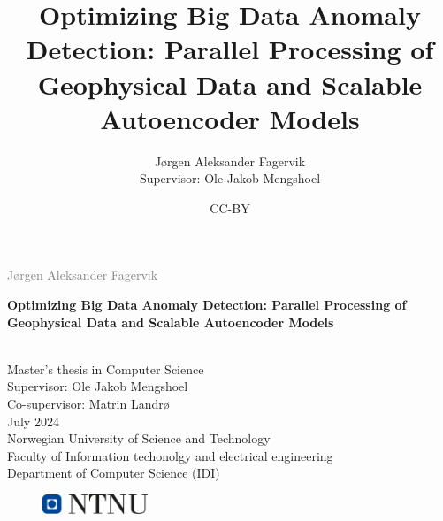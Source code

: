 \documentclass[british]{ntnuthesis}
\title{Optimizing Big Data Anomaly Detection: Parallel Processing of Geophysical Data and Scalable Autoencoder Models}
\author{Jørgen Aleksander Fagervik \\
        Supervisor: Ole Jakob Mengshoel}
\date{CC-BY \ntnuthesisdate}
\begin{document}
\begin{titlepage}
\vspace*{1.5cm}

\noindent  \textcolor{gray}{\large Jørgen Aleksander Fagervik} \\
\vspace{1cm}

\noindent \textbf{\Large Optimizing Big Data Anomaly Detection: Parallel Processing of Geophysical Data and Scalable Autoencoder Models} \\
\vspace{0.5cm}

 \\



\vspace{7cm}
\noindent Master's thesis in Computer Science \\
Supervisor: Ole Jakob Mengshoel \\
Co-supervisor: Matrin Landrø \\
July 2024 \\

\vspace{0.2cm}
\noindent Norwegian University of Science and Technology \\
Faculty of Information techonolgy and electrical engineering \\
Department of Computer Science (IDI) \\

\begin{figure}[h]
    \includegraphics[width=0.28\textwidth]{figures/ntnu_basic.png}
\end{figure}
\end{titlepage}
\restoregeometry
\myemptypage 





\tableofcontents
\listoffigures
\listoftables
\lstlistoflistings

\printglossary[type=\acronymtype] %
\printglossary                    %









\chapter*{\bibname}
\printbibliography[heading=none]

%

\appendix







\end{document}
